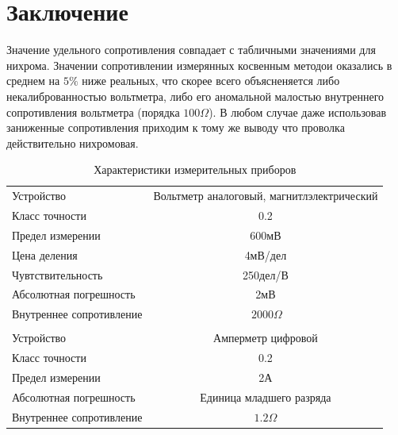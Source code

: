 \documentclass[a4paper, 12pt]{article}
\begin{document}
    \section{Заключение}
    Значение удельного сопротивления совпадает с табличными значениями для нихрома. Значении сопротивлении измерянных косвенным методои оказались в среднем на $5\%$ ниже реальных, что скорее всего объясненяется либо некалиброванностью вольтметра, либо его аномальной малостью внутреннего сопротивления вольтметра (порядка $100\Omega$). В любом случае даже использовав заниженные сопротивления приходим к тому же выводу что проволка действительно нихромовая.
    \newpage


    \begin{table}
        \begin{center}

        \begin{tabular}{|l|c|}
        \hline
        Устройство & Вольтметр аналоговый, магнитлэлектрический \\\rowcolor{Gray}
        \hline
        Класс точности &  0.2\\
        \hline
        Предел измерении&  600мВ \\\rowcolor{Gray}
        \hline
        Цена деления&  4мВ/дел \\
        \hline
        Чувтствительность &  250дел/В \\\rowcolor{Gray}
        \hline
        Абсолютная погрешность&  2мВ \\
        \hline
        Внутреннее сопротивление&  $~2000\Omega$\\
        \hline

        \multicolumn{2}{c}{} \\\rowcolor{Gray}


        \hline
        Устройство & Амперметр цифровой\\
        \hline
        Класс точности &  0.2\\\rowcolor{Gray}
        \hline
        Предел измерении&  2А \\
        \hline
        Абсолютная погрешность&  Единица младшего разряда \\\rowcolor{Gray}
        \hline
        Внутреннее сопротивление&  $1.2\Omega$\\
        \hline
        \end{tabular}
            \caption{Характеристики измерительных приборов}
        \end{center}

    \end{table}
\end{document}
